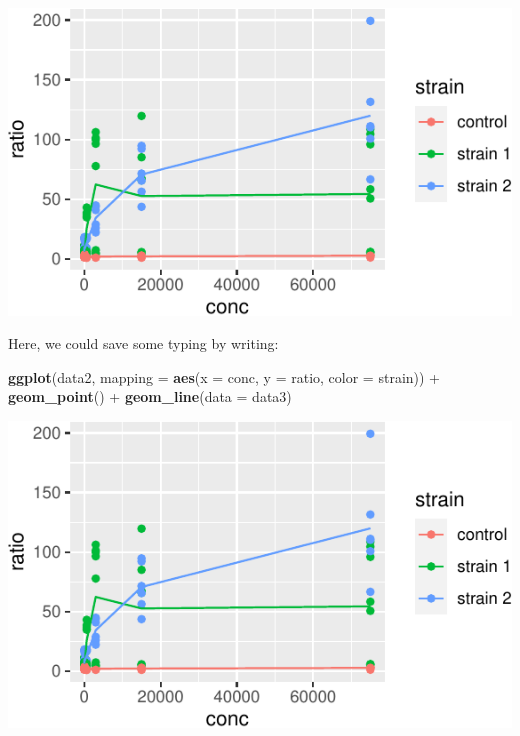 \documentclass[]{book}
\newenvironment{Shaded}{}{}
\newcommand{\DataTypeTok}[1]{\textcolor[rgb]{0.56,0.13,0.00}{#1}}
\newcommand{\KeywordTok}[1]{\textcolor[rgb]{0.00,0.44,0.13}{\textbf{#1}}}
\newcommand{\NormalTok}[1]{#1}
\newcommand{\OperatorTok}[1]{\textcolor[rgb]{0.40,0.40,0.40}{#1}}
\newcommand{\StringTok}[1]{\textcolor[rgb]{0.25,0.44,0.63}{#1}}
\begin{document}
\begin{center}\includegraphics[width=\textwidth]{TRES-Tidy-Tutorial_files/figure-latex/unnamed-chunk-126-1} \end{center}

Here, we could save some typing by writing:

\begin{Shaded}
\begin{Highlighting}[]
 \KeywordTok{ggplot}\NormalTok{(data2, }\DataTypeTok{mapping =} \KeywordTok{aes}\NormalTok{(}\DataTypeTok{x =}\NormalTok{ conc, }\DataTypeTok{y =}\NormalTok{ ratio, }\DataTypeTok{color =}\NormalTok{ strain)) }\OperatorTok{+}
\StringTok{  }\KeywordTok{geom_point}\NormalTok{() }\OperatorTok{+}
\StringTok{  }\KeywordTok{geom_line}\NormalTok{(}\DataTypeTok{data =}\NormalTok{ data3)}
\end{Highlighting}
\end{Shaded}

\begin{center}\includegraphics[width=\textwidth]{TRES-Tidy-Tutorial_files/figure-latex/unnamed-chunk-127-1} \end{center}
\end{document}
